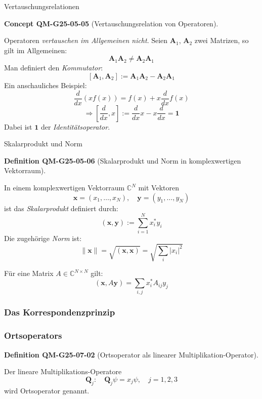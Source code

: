 \documentclass[10pt, letterpaper]{article}
\newcommand{\CustomHeading}[3]{%
  \par\medskip\noindent%
  \textbf{#1 #2} \textnormal{(#3)}.\enskip%
}
\newenvironment{DEF}[2]{\begin{unitbox}\CustomHeading{Definition}{#1}{#2}}{\end{unitbox}}
\newenvironment{CONC}[2]{\begin{unitbox}\CustomHeading{Concept}{#1}{#2}}{\end{unitbox}}
\begin{document}
\vspace{1em}




Vertauschungsrelationen

\begin{CONC}{QM-G25-05-05}{Vertauschungsrelation von Operatoren}
Operatoren \emph{vertauschen im Allgemeinen nicht}. Seien $\mathbf{A}_1$, $\mathbf{A}_2$ zwei Matrizen, so gilt im Allgemeinen:
\[
\mathbf{A}_1 \mathbf{A}_2 \neq \mathbf{A}_2 \mathbf{A}_1
\]
Man definiert den \emph{Kommutator}:
\[
[\mathbf{A}_1, \mathbf{A}_2] := \mathbf{A}_1 \mathbf{A}_2 - \mathbf{A}_2 \mathbf{A}_1
\]
Ein anschauliches Beispiel:
\[
\frac{d}{dx}(x f(x)) = f(x) + x \frac{d}{dx} f(x)
\]
\[
\Rightarrow \left[ \frac{d}{dx}, x \right] := \frac{d}{dx} x - x \frac{d}{dx} = \mathbf{1}
\]
Dabei ist $\mathbf{1}$ der \emph{Identitätsoperator}.
\end{CONC}

\vspace{1em}



Skalarprodukt und Norm


\begin{DEF}{QM-G25-05-06}{Skalarprodukt und Norm in komplexwertigen Vektorraum}
In einem komplexwertigen Vektorraum $\mathbb{C}^N$ mit Vektoren
\[
\mathbf{x} = (x_1, \dots, x_N), \quad \mathbf{y} = (y_1, \dots, y_N)
\]
ist das \emph{Skalarprodukt} definiert durch:
\[
(\mathbf{x}, \mathbf{y}) := \sum_{i=1}^N x_i^* y_i
\]
Die zugehörige \emph{Norm} ist:
\[
\|\mathbf{x}\| = \sqrt{(\mathbf{x}, \mathbf{x})} = \sqrt{\sum_i |x_i|^2}
\]

Für eine Matrix $A \in \mathbb{C}^{N \times N}$ gilt:
\[
(\mathbf{x}, A \mathbf{y}) = \sum_{i,j} x_i^* A_{ij} y_j
\]
\end{DEF}





\subsubsection{Das Korrespondenzprinzip}


\subsubsection*{Ortsoperators}


\begin{DEF}{QM-G25-07-02}{Ortsoperator als linearer Multiplikation-Operator}
Der lineare Multiplikations-Operatore
$$
\mathbf{Q}_{j}: \quad \mathbf{Q}_{j} \psi=x_{j} \psi, \quad j=1,2,3
$$
wird Ortsoperator genannt.
\end{DEF}
\end{document}
